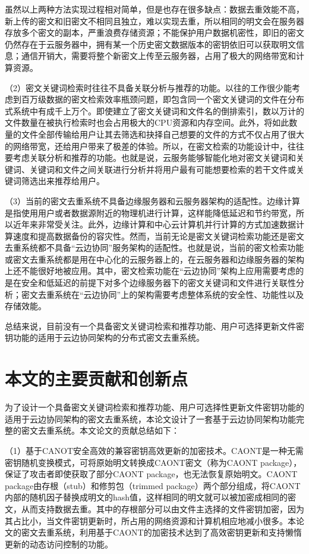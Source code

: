\documentclass[promaster]{thesis-uestc}
\begin{document}
虽然以上两种方法实现过程相对简单，但是也存在很多缺点：数据去重效能不高，新上传的密文和旧密文不相同且独立，难以实现去重，所以相同的明文会在服务器存放多个密文的副本，严重浪费存储资源；不能保护用户数据机密性，即旧的密文仍然存在于云服务器中，拥有某一个历史密文数据版本的密钥依旧可以获取明文信息；通信开销大，需要将整个新密文上传至云服务器，占用了极大的网络带宽和计算资源。

（2）密文关键词检索时往往不具备关联分析与推荐的功能。以往的工作很少能考虑到百万级数据的密文检索效率瓶颈问题，即包含同一个密文关键词的文件在分布式系统中有成千上万个。即使建立了密文关键词和文件名的倒排索引，数以万计的文件数量在被执行检索时也会占用极大的CPU资源和内存空间。此外，将如此数量的文件全部传输给用户让其去筛选和抉择自己想要的文件的方式不仅占用了很大的网络带宽，还给用户带来了极差的体验。所以，在密文检索的功能设计中，往往要考虑关联分析和推荐的功能。也就是说，云服务能够智能化地对密文关键词和关键词、关键词和文件之间关联进行分析并将用户最有可能想要检索的若干文件或关键词筛选出来推荐给用户。

（3）当前的密文去重系统不具备边缘服务器和云服务器架构的适配性。边缘计算是指使用用户或者数据源附近的物理机进行计算，这样能降低延迟和节约带宽，所以近年来非常受关注。此外，边缘计算和中心云计算机并行计算的方式加速数据计算速度和提高数据备份的容灾性。然而，当前无论是密文关键词检索功能还是密文去重系统都不具备“云边协同”服务架构的适配性。也就是说，当前的密文检索功能或密文去重系统都是用在中心化的云服务器上的，在云服务器和边缘服务器的架构上还不能很好地被应用。其中，密文检索功能在“云边协同”架构上应用需要考虑的是在安全和低延迟的前提下对多个边缘服务器下的密文关键词和文件进行关联性分析；密文去重系统在“云边协同”上的架构需要考虑整体系统的安全性、功能性以及存储效能。

总结来说，目前没有一个具备密文关键词检索和推荐功能、用户可选择更新文件密钥功能的适用于云边协同架构的分布式密文去重系统。

\section{本文的主要贡献和创新点}\label{本文的主要贡献和创新点}
为了设计一个具备密文关键词检索和推荐功能、用户可选择性更新文件密钥功能的适用于云边协同架构的密文去重系统，本论文设计了一套基于云边协同架构功能完整的密文去重系统。本文论文的贡献总结如下：

（1）基于CANOT安全高效的兼容密钥高效更新的加密技术。CAONT是一种无需密钥随机变换模式，可将原始明文转换成CAONT密文（称为CAONT package），保证了攻击者即使获取了部分CAONT package，也无法恢复原始明文。CAONT package由存根（stub）和修剪包（trimmed package）两个部分组成，将CAONT内部的随机因子替换成明文的hash值，这样相同的明文就可以被加密成相同的密文，从而支持数据去重。其中的存根部分可以由文件主选择的文件密钥加密，因为其占比小，当文件密钥更新时，所占用的网络资源和计算机相应地减小很多。本论文的密文去重系统，利用基于CAONT的加密技术达到了高效密钥更新和支持懒惰更新的动态访问控制的功能。
\end{document}
